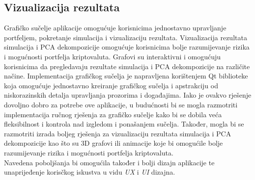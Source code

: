 \documentclass[zavrsnirad]{fer}
\begin{document}
\subsection{Vizualizacija rezultata}
\label{sek:vizualizacija_rezultata_rezultati}
Grafičko sučelje aplikacije omogućuje korisnicima jednostavno
upravljanje portfeljem, pokretanje simulacija i vizualizaciju rezultata.
Vizualizacija rezultata simulacija i PCA dekompozicije
omogućuje korisnicima bolje razumijevanje rizika i mogućnosti portfelja
kriptovaluta. Grafovi su interaktivni i omogućuju korisnicima
da pregledavaju rezultate simulacija i PCA dekompozicije na različite načine.
Implementacija grafičkog sučelja je napravljena korištenjem Qt biblioteke
koja omogućuje jednostavno kreiranje grafičkog sučelja i apstrakciju
od niskorazinskih detalja upravljanja prozorima i događajima.
Iako je ovakvo rješenje dovoljno dobro za potrebe ove aplikacije,
u budućnosti bi se mogla razmotriti implementacija ručnog rješenja
za grafičko sučelje kako bi se dobila veća fleksibilnost i kontrola
nad izgledom i ponašanjem sučelja. Također, mogla bi se razmotriti
izrada boljeg rješenja za vizualizaciju rezultata simulacija i PCA dekompozicije
kao što su 3D grafovi ili animacije koje bi omogućile bolje razumijevanje
rizika i mogućnosti portfelja kriptovaluta.\\
Navedena poboljšanja bi omogućila također i bolji dizajn aplikacije
te unaprijeđenje korisčkog iskustva u vidu \textit{UX} i \textit{UI} dizajna.
\end{document}
